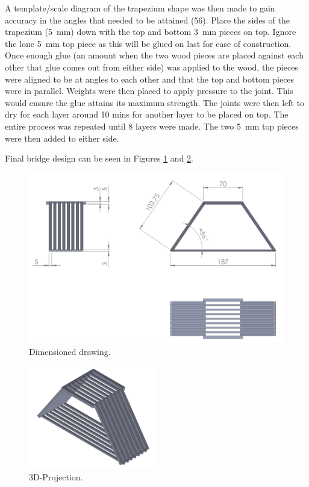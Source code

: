 \documentclass[12pt]{article}
\begin{document}
A template/scale diagram of the trapezium shape was then made to gain accuracy in the angles that needed to be attained (56\textdegree). Place the sides of the trapezium (5~mm) down with the top and bottom 3~mm pieces on top. Ignore the lone 5~mm top piece as this will be glued on last for ease of construction. Once enough glue (an amount when the two wood pieces are placed against each other that glue comes out from either side) was applied to the wood, the pieces were aligned to be at angles to each other and that the top and bottom pieces were in parallel. Weights were then placed to apply pressure to the joint. This would ensure the glue attains its maximum strength. The joints were then left to dry for each layer around 10 mins for another layer to be placed on top. The entire process was repeated until 8 layers were made.  The two 5~mm top pieces were then added to either side.


		Final bridge design can be seen in Figures \ref{dim} and \ref{proj}.
		\begin{figure}[h!]
			\centering
			\includegraphics[width=\textwidth]{dim}
			\caption{Dimensioned drawing.}
			\label{dim}
		\end{figure}
		\begin{figure}[h!]
			\centering
			\includegraphics[width=0.5\textwidth]{proj}
			\caption{3D-Projection.}
			\label{proj}
		\end{figure}
\end{document}
